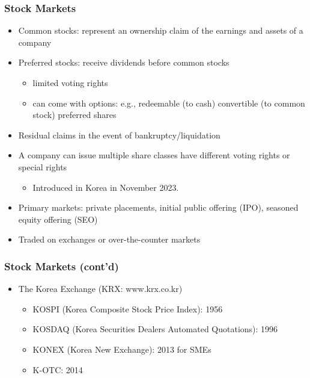 \documentclass[10pt]{beamer}
\begin{document}
	
	\begin{frame}
		\frametitle{Stock Markets}
		
		\begin{itemize}
			\item Common stocks: represent an ownership claim of the earnings and assets of a company
			\item Preferred stocks: receive dividends before common stocks
			\begin{itemize}
				\item limited voting rights
				\item can come with options: e.g., redeemable (to cash) convertible (to common stock) preferred shares 
			\end{itemize}
			\item Residual claims in the event of bankruptcy/liquidation
			
			\item A company can issue multiple share classes have different voting rights or special rights 
			\begin{itemize}
				\item Introduced in Korea in November 2023.
			\end{itemize}
			
			\item Primary markets: private placements, initial public offering (IPO), seasoned equity offering (SEO)
			\item Traded on exchanges or over-the-counter markets
		\end{itemize}
		
	\end{frame}
	
	
	
	\begin{frame}
		\frametitle{Stock Markets (cont'd)}
		
		\begin{itemize} \vspace{5pt} \itemsep10pt
			\item The Korea Exchange (KRX: www.krx.co.kr)
			\begin{itemize} \vspace{5pt} \itemsep10pt
				\item KOSPI (Korea Composite Stock Price Index): 1956
				\item KOSDAQ (Korea Securities Dealers Automated Quotations): 1996
				\item KONEX (Korea New Exchange): 2013 for SMEs
				\item K-OTC: 2014
			\end{itemize}
			
		\end{itemize}
		
	\end{frame}
	
\end{document}
